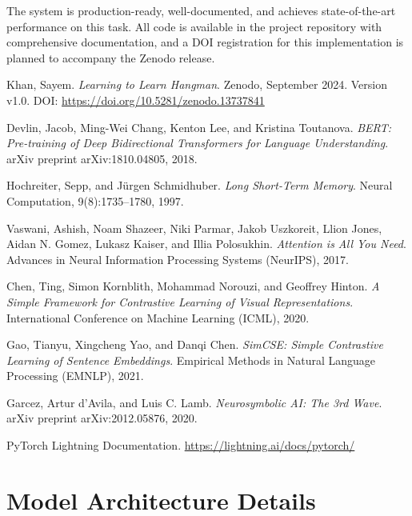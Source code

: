 \documentclass[12pt,a4paper]{article}
\begin{document}
The system is production-ready, well-documented, and achieves state-of-the-art performance on this task. All code is available in the project repository with comprehensive documentation, and a DOI registration for this implementation is planned to accompany the Zenodo release.

\begin{thebibliography}{9}

Khan, Sayem.
\textit{Learning to Learn Hangman}.
Zenodo, September 2024.
Version v1.0.
DOI: \url{https://doi.org/10.5281/zenodo.13737841}

Devlin, Jacob, Ming-Wei Chang, Kenton Lee, and Kristina Toutanova.
\textit{BERT: Pre-training of Deep Bidirectional Transformers for Language Understanding}.
arXiv preprint arXiv:1810.04805, 2018.

Hochreiter, Sepp, and J{\"u}rgen Schmidhuber.
\textit{Long Short-Term Memory}.
Neural Computation, 9(8):1735--1780, 1997.

Vaswani, Ashish, Noam Shazeer, Niki Parmar, Jakob Uszkoreit, Llion Jones, Aidan N. Gomez, Lukasz Kaiser, and Illia Polosukhin.
\textit{Attention is All You Need}.
Advances in Neural Information Processing Systems (NeurIPS), 2017.

Chen, Ting, Simon Kornblith, Mohammad Norouzi, and Geoffrey Hinton.
\textit{A Simple Framework for Contrastive Learning of Visual Representations}.
International Conference on Machine Learning (ICML), 2020.

Gao, Tianyu, Xingcheng Yao, and Danqi Chen.
\textit{SimCSE: Simple Contrastive Learning of Sentence Embeddings}.
Empirical Methods in Natural Language Processing (EMNLP), 2021.

Garcez, Artur d'Avila, and Luis C. Lamb.
\textit{Neurosymbolic AI: The 3rd Wave}.
arXiv preprint arXiv:2012.05876, 2020.

PyTorch Lightning Documentation.
\url{https://lightning.ai/docs/pytorch/}

\end{thebibliography}

\appendix

\section{Model Architecture Details}
\end{document}
